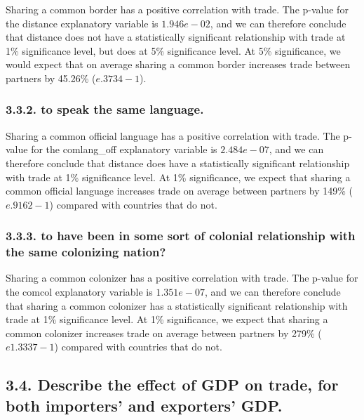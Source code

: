 \documentclass[
]{article}
\begin{document}
Sharing a common border has a positive correlation with trade. The
p-value for the distance explanatory variable is \(1.946e-02\), and we
can therefore conclude that distance does not have a statistically
significant relationship with trade at 1\% significance level, but does
at 5\% significance level. At 5\% significance, we would expect that on
average sharing a common border increases trade between partners by
45.26\% (\(e.3734-1\)).

\hypertarget{to-speak-the-same-language.}{%
\subsubsection{3.3.2. to speak the same
language.}\label{to-speak-the-same-language.}}

Sharing a common official language has a positive correlation with
trade. The p-value for the comlang\_off explanatory variable is
\(2.484e-07\), and we can therefore conclude that distance does have a
statistically significant relationship with trade at 1\% significance
level. At 1\% significance, we expect that sharing a common official
language increases trade on average between partners by 149\%
(\(e.9162-1\)) compared with countries that do not.

\hypertarget{to-have-been-in-some-sort-of-colonial-relationship-with-the-same-colonizing-nation}{%
\subsubsection{3.3.3. to have been in some sort of colonial relationship
with the same colonizing
nation?}\label{to-have-been-in-some-sort-of-colonial-relationship-with-the-same-colonizing-nation}}

Sharing a common colonizer has a positive correlation with trade. The
p-value for the comcol explanatory variable is \(1.351e-07\), and we can
therefore conclude that sharing a common colonizer has a statistically
significant relationship with trade at 1\% significance level. At 1\%
significance, we expect that sharing a common colonizer increases trade
on average between partners by 279\% (\(e1.3337-1\)) compared with
countries that do not.

\hypertarget{describe-the-effect-of-gdp-on-trade-for-both-importers-and-exporters-gdp.}{%
\subsection{3.4. Describe the effect of GDP on trade, for both
importers' and exporters'
GDP.}\label{describe-the-effect-of-gdp-on-trade-for-both-importers-and-exporters-gdp.}}
\end{document}
